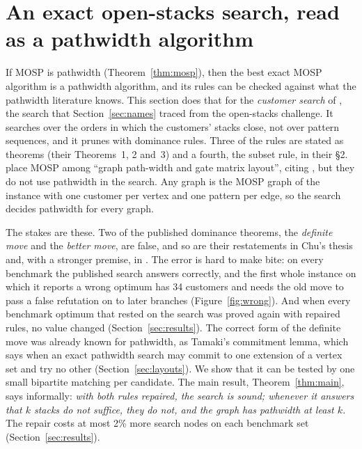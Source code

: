 \section{An exact open-stacks search, read as a pathwidth algorithm}
\label{sec:search}

If MOSP is pathwidth (Theorem~\ref{thm:mosp}), then the best exact MOSP
algorithm is a pathwidth algorithm, and its rules can be checked against what
the pathwidth literature knows. This section does that for the \emph{customer
search} of \citet{ChuStuckey2009}, the search that Section~\ref{sec:names}
traced from the open-stacks challenge. It searches over the orders in which the
customers' stacks close, not over pattern sequences, and it prunes with
dominance rules. Three of the rules are stated as theorems (their Theorems~1,
2 and~3) and a fourth, the subset rule, in their \S2. \citet{ChuStuckey2009}
place MOSP among ``graph path-width and gate matrix layout'', citing
\citet{LY2002}, but they do not use pathwidth in the search. Any graph is the
MOSP graph of the instance with one customer per vertex and one pattern per
edge, so the search decides pathwidth for every graph.

The stakes are these. Two of the published dominance theorems, the
\emph{definite move} and the \emph{better move}, are false, and so are their
restatements in Chu's thesis \citep{Chu2011} and, with a stronger premise, in
\citet{Fink2012}. The error is hard to make bite: on every benchmark the
published search answers correctly, and the first whole instance on which it
reports a wrong optimum has 34 customers and needs the old move to pass a
false refutation on to later branches (Figure~\ref{fig:wrong}). And when every
benchmark optimum that rested on the search was proved again with repaired
rules, no value changed (Section~\ref{sec:results}). The correct form of the
definite move was already known for pathwidth, as Tamaki's commitment lemma,
which says when an exact pathwidth search may commit to one extension of a
vertex set and try no other (Section~\ref{sec:layouts}). We
show that it can be tested by one small bipartite matching per candidate. The
main result, Theorem~\ref{thm:main}, says informally: \emph{with both rules
repaired, the search is sound; whenever it answers that $k$ stacks do not
suffice, they do not, and the graph has pathwidth at least $k$.} The repair
costs at most 2\% more search nodes on each benchmark set
(Section~\ref{sec:results}).

